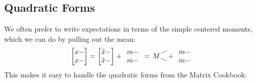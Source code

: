 \subsection{Quadratic Forms}
We often prefer to write expectations in terms of the simple centered moments, which we can do by pulling out the mean:
\renewcommand*{\arraystretch}{1}
\[
   \begin{bmatrix}
      x - \\
      x -
   \end{bmatrix}
   =
   \begin{bmatrix}
      \tilde x - \\
      \tilde x -
   \end{bmatrix}
   +
   \begin{array}{c}
      m - \\
      m -
   \end{array}
   =
   \begin{tikzpicture}[baseline=(T.base), inner sep=1pt]
      \node (T) {$M$};
      \draw (T) -- ++(.5,.25);
      \draw (T) -- ++(.5,-.25);
   \end{tikzpicture}
   +
   \begin{array}{c}
      m - \\
      m -
   \end{array}
\]
This makes it easy to handle the quadratic forms from the Matrix Cookbook:
